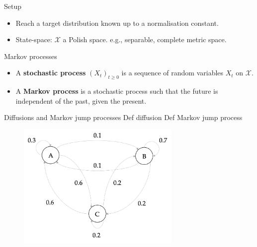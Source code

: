 \documentclass{beamer}
\begin{document}
\begin{frame}{Setup}
\begin{itemize}
    \item Reach a target distribution known up to a normalisation constant.
    \item State-space: $\mathcal X$ a Polish space. e.g., separable, complete metric space.
\end{itemize}
\end{frame}

\begin{frame}{Markov processes}
\begin{itemize}
    \item A \textbf{stochastic process} $(X_t)_{t \geq 0}$ is a sequence of random variables $X_t$ on $\mathcal X$.
    \item A \textbf{Markov process} is a stochastic process such that the future is independent of the past, given the present.
\end{itemize}
\end{frame}

\begin{frame}{Diffusions and Markov jump processes}
    Def diffusion
    Def Markov jump process
    
    \begin{figure}
        \centering
        \includegraphics[width=0.7\textwidth]{Markov_chain.png}
    \end{figure}
\end{frame}
\end{document}
